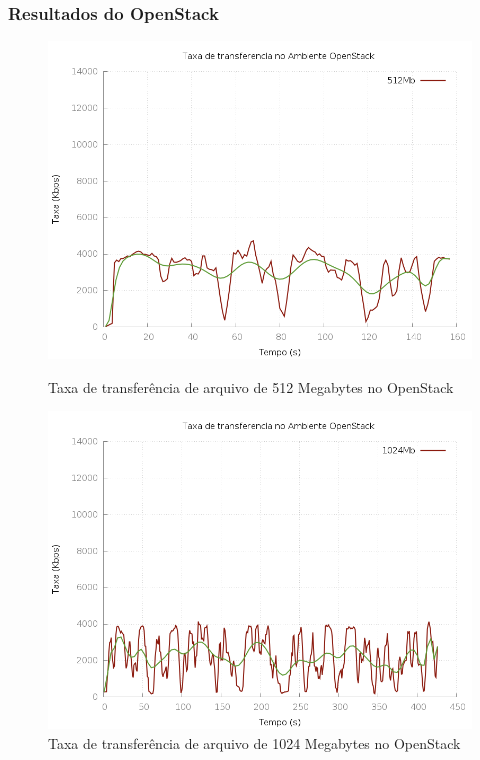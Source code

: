 \documentclass{beamer}
\begin{document}
\begin{frame}
    \frametitle{Resultados do OpenStack}

    \begin{figure}[ht]
        \centering
        \begin{minipage}[b]{0.49\linewidth}
            \centering
            \includegraphics[width=\textwidth]{data/data_cp_openstack/taxa_512}
            \caption{Taxa de transferência de arquivo de 512 Megabytes no OpenStack}
            \label{fig:openstack512}
        \end{minipage}
        \begin{minipage}[b]{0.49\linewidth}
            \centering
            \includegraphics[width=\textwidth]{data/data_cp_openstack/taxa_1024}
            \caption{Taxa de transferência de arquivo de 1024 Megabytes no OpenStack}
            \label{fig:openstack1024}
        \end{minipage}
    \end{figure}
\end{frame}
\end{document}
